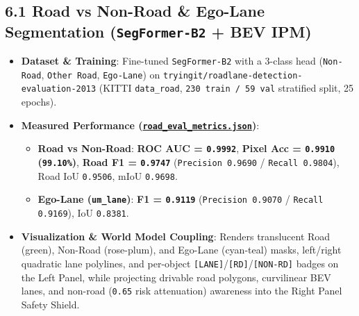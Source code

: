 \documentclass[10.5pt,a4paper]{article}
\begin{document}
\subsection{6.1 Road vs Non-Road \& Ego-Lane Segmentation (\texttt{SegFormer-\allowbreak{}B2} + BEV IPM)}
\begin{itemize}[leftmargin=1.5em,itemsep=2pt]
\item \textbf{Dataset \& Training}: Fine-tuned \texttt{SegFormer-\allowbreak{}B2} with a 3-class head (\texttt{Non-\allowbreak{}Road}, \texttt{Other Road}, \texttt{Ego-\allowbreak{}Lane}) on \texttt{tryingit/\allowbreak{}roadlane-\allowbreak{}detection-\allowbreak{}evaluation-\allowbreak{}2013} (KITTI \texttt{data\_\allowbreak{}road}, \texttt{230 train /\allowbreak{} 59 val} stratified split, 25 epochs).
\item \textbf{Measured Performance (\href{https://github.com/Heisnotanimposter/Totalcare\_autonomous\_driving\_Yolov5/blob/main/results/v4\_road\_lane/road\_outputs/road\_lane\_outputs/road\_eval\_metrics.json}{\texttt{road\_\allowbreak{}eval\_\allowbreak{}metrics.\allowbreak{}json}})}:
\begin{itemize}[leftmargin=1.5em,itemsep=2pt]
\item \textbf{Road vs Non-Road}: \textbf{ROC AUC = \texttt{0.\allowbreak{}9992}}, \textbf{Pixel Acc = \texttt{0.\allowbreak{}9910} (\texttt{99.\allowbreak{}10\%})}, \textbf{Road F1 = \texttt{0.\allowbreak{}9747}} (\texttt{Precision 0.\allowbreak{}9690} / \texttt{Recall 0.\allowbreak{}9804}), Road IoU \texttt{0.\allowbreak{}9506}, mIoU \texttt{0.\allowbreak{}9698}.
\item \textbf{Ego-Lane (\texttt{um\_\allowbreak{}lane})}: \textbf{F1 = \texttt{0.\allowbreak{}9119}} (\texttt{Precision 0.\allowbreak{}9070} / \texttt{Recall 0.\allowbreak{}9169}), IoU \texttt{0.\allowbreak{}8381}.
\end{itemize}
\item \textbf{Visualization \& World Model Coupling}: Renders translucent Road (green), Non-Road (rose-plum), and Ego-Lane (cyan-teal) masks, left/right quadratic lane polylines, and per-object \texttt{[LANE]}/\texttt{[RD]}/\texttt{[NON-\allowbreak{}RD]} badges on the Left Panel, while projecting drivable road polygons, curvilinear BEV lanes, and non-road (\texttt{0.\allowbreak{}65} risk attenuation) awareness into the Right Panel Safety Shield.
\end{itemize}
\end{document}
